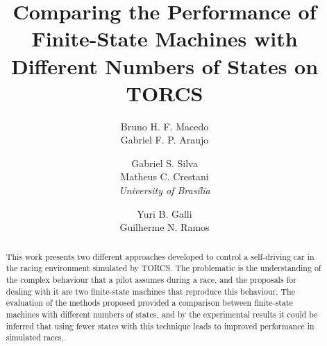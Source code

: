 \documentclass[a4paper]{sbgames}
\title{Comparing the Performance of Finite-State Machines with Different Numbers of States on TORCS}
\author{Bruno H. F. Macedo\\Gabriel F. P. Araujo\\
		\and Gabriel S. Silva\\Matheus C. Crestani\\\textit{University of Bras\'{i}lia}
		\and Yuri B. Galli\\ Guilherme N. Ramos\\
}
\begin{document}
	\maketitle

	\begin{abstract}
		
		This work presents two different approaches developed to control a self-driving car in the racing environment
		simulated by TORCS. The problematic is the understanding of the complex behaviour that a pilot assumes during
		a race, and the proposals for dealing with it are two finite-state machines that reproduce this behaviour. The
		evaluation of the methods proposed provided a comparison between finite-state machines with different numbers
		of states, and by the experimental results it could be inferred that using fewer states with this technique
		leads to improved performance in simulated races.
		
	\end{abstract}

	\keywordlist
	\contactlist
	
	
	
	
	
	

	
	
	
	
\end{document}
